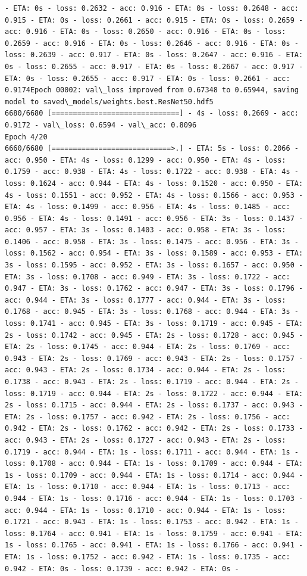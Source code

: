 \documentclass[11pt]{article}
\begin{document}
\begin{Verbatim}[commandchars=\\\{\}]
- ETA: 0s - loss: 0.2632 - acc: 0.916 - ETA: 0s - loss: 0.2648 - acc: 0.915 - ETA: 0s - loss: 0.2661 - acc: 0.915 - ETA: 0s - loss: 0.2659 - acc: 0.916 - ETA: 0s - loss: 0.2650 - acc: 0.916 - ETA: 0s - loss: 0.2659 - acc: 0.916 - ETA: 0s - loss: 0.2646 - acc: 0.916 - ETA: 0s - loss: 0.2639 - acc: 0.917 - ETA: 0s - loss: 0.2647 - acc: 0.916 - ETA: 0s - loss: 0.2655 - acc: 0.917 - ETA: 0s - loss: 0.2667 - acc: 0.917 - ETA: 0s - loss: 0.2655 - acc: 0.917 - ETA: 0s - loss: 0.2661 - acc: 0.9174Epoch 00002: val\_loss improved from 0.67348 to 0.65944, saving model to saved\_models/weights.best.ResNet50.hdf5
6680/6680 [==============================] - 4s - loss: 0.2669 - acc: 0.9172 - val\_loss: 0.6594 - val\_acc: 0.8096
Epoch 4/20
6660/6680 [============================>.] - ETA: 5s - loss: 0.2066 - acc: 0.950 - ETA: 4s - loss: 0.1299 - acc: 0.950 - ETA: 4s - loss: 0.1759 - acc: 0.938 - ETA: 4s - loss: 0.1722 - acc: 0.938 - ETA: 4s - loss: 0.1624 - acc: 0.944 - ETA: 4s - loss: 0.1520 - acc: 0.950 - ETA: 4s - loss: 0.1551 - acc: 0.952 - ETA: 4s - loss: 0.1566 - acc: 0.953 - ETA: 4s - loss: 0.1499 - acc: 0.956 - ETA: 4s - loss: 0.1485 - acc: 0.956 - ETA: 4s - loss: 0.1491 - acc: 0.956 - ETA: 3s - loss: 0.1437 - acc: 0.957 - ETA: 3s - loss: 0.1403 - acc: 0.958 - ETA: 3s - loss: 0.1406 - acc: 0.958 - ETA: 3s - loss: 0.1475 - acc: 0.956 - ETA: 3s - loss: 0.1562 - acc: 0.954 - ETA: 3s - loss: 0.1589 - acc: 0.953 - ETA: 3s - loss: 0.1595 - acc: 0.952 - ETA: 3s - loss: 0.1657 - acc: 0.950 - ETA: 3s - loss: 0.1708 - acc: 0.949 - ETA: 3s - loss: 0.1722 - acc: 0.947 - ETA: 3s - loss: 0.1762 - acc: 0.947 - ETA: 3s - loss: 0.1796 - acc: 0.944 - ETA: 3s - loss: 0.1777 - acc: 0.944 - ETA: 3s - loss: 0.1768 - acc: 0.945 - ETA: 3s - loss: 0.1768 - acc: 0.944 - ETA: 3s - loss: 0.1741 - acc: 0.945 - ETA: 3s - loss: 0.1719 - acc: 0.945 - ETA: 2s - loss: 0.1742 - acc: 0.945 - ETA: 2s - loss: 0.1728 - acc: 0.945 - ETA: 2s - loss: 0.1745 - acc: 0.944 - ETA: 2s - loss: 0.1769 - acc: 0.943 - ETA: 2s - loss: 0.1769 - acc: 0.943 - ETA: 2s - loss: 0.1757 - acc: 0.943 - ETA: 2s - loss: 0.1734 - acc: 0.944 - ETA: 2s - loss: 0.1738 - acc: 0.943 - ETA: 2s - loss: 0.1719 - acc: 0.944 - ETA: 2s - loss: 0.1719 - acc: 0.944 - ETA: 2s - loss: 0.1722 - acc: 0.944 - ETA: 2s - loss: 0.1715 - acc: 0.944 - ETA: 2s - loss: 0.1737 - acc: 0.943 - ETA: 2s - loss: 0.1757 - acc: 0.942 - ETA: 2s - loss: 0.1756 - acc: 0.942 - ETA: 2s - loss: 0.1762 - acc: 0.942 - ETA: 2s - loss: 0.1733 - acc: 0.943 - ETA: 2s - loss: 0.1727 - acc: 0.943 - ETA: 2s - loss: 0.1719 - acc: 0.944 - ETA: 1s - loss: 0.1711 - acc: 0.944 - ETA: 1s - loss: 0.1708 - acc: 0.944 - ETA: 1s - loss: 0.1709 - acc: 0.944 - ETA: 1s - loss: 0.1709 - acc: 0.944 - ETA: 1s - loss: 0.1714 - acc: 0.944 - ETA: 1s - loss: 0.1710 - acc: 0.944 - ETA: 1s - loss: 0.1713 - acc: 0.944 - ETA: 1s - loss: 0.1716 - acc: 0.944 - ETA: 1s - loss: 0.1703 - acc: 0.944 - ETA: 1s - loss: 0.1710 - acc: 0.944 - ETA: 1s - loss: 0.1721 - acc: 0.943 - ETA: 1s - loss: 0.1753 - acc: 0.942 - ETA: 1s - loss: 0.1764 - acc: 0.941 - ETA: 1s - loss: 0.1759 - acc: 0.941 - ETA: 1s - loss: 0.1765 - acc: 0.941 - ETA: 1s - loss: 0.1766 - acc: 0.941 - ETA: 1s - loss: 0.1752 - acc: 0.942 - ETA: 1s - loss: 0.1735 - acc: 0.942 - ETA: 0s - loss: 0.1739 - acc: 0.942 - ETA: 0s - 
\end{Verbatim}
\end{document}
